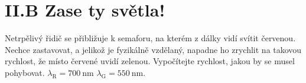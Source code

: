 \documentclass{../../../../style/mkimain}
\begin{document}
\section*{II.B Zase ty světla!}
\noindent
Netrpělivý řidič se přibližuje k semaforu, na kterém z dálky vidí svítit červenou.
Nechce zastavovat, a jelikož je fyzikálně vzdělaný, napadne ho zrychlit na takovou rychlost, že místo červené uvidí zelenou.
Vypočítejte rychlost, jakou by se musel pohybovat. $\lambda_\mathrm{R}=\qty{700}{\nm}$ $\lambda_\mathrm{G}=\qty{550}{\nm}$.
\end{document}

